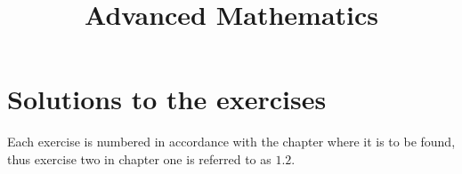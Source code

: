 \documentclass[11pt,twoside,openright]{memoir}
\title{Advanced Mathematics}
\begin{document}
\let\cleardoublepage\clearpage
\maketitle

\tableofcontents
{}


\mainmatter









\appendix
\chapter{Solutions to the exercises}
Each exercise is numbered in accordance with the chapter where it is to be found, thus exercise two in chapter one is referred to as $1.2$.
\shipoutAnswer

\backmatter
\printindex
\end{document}
